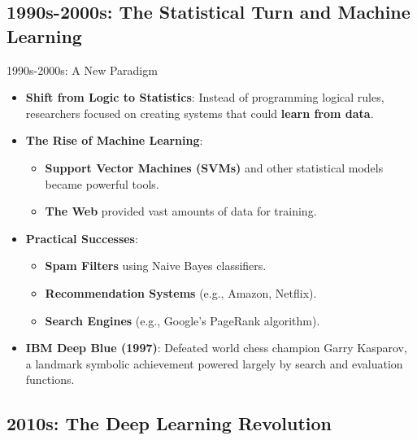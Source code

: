 \documentclass{beamer}
\begin{document}
\subsection{1990s-2000s: The Statistical Turn and Machine Learning}

\begin{frame}[t]{1990s-2000s: A New Paradigm}
\begin{itemize}
    \item \textbf{Shift from Logic to Statistics}: Instead of programming logical rules, researchers focused on creating systems that could \textbf{learn from data}.
    \item \textbf{The Rise of Machine Learning}:
        \begin{itemize}
            \item \textbf{Support Vector Machines (SVMs)} and other statistical models became powerful tools.
            \item \textbf{The Web} provided vast amounts of data for training.
        \end{itemize}
    \item \textbf{Practical Successes}:
        \begin{itemize}
            \item \textbf{Spam Filters} using Naive Bayes classifiers.
            \item \textbf{Recommendation Systems} (e.g., Amazon, Netflix).
            \item \textbf{Search Engines} (e.g., Google's PageRank algorithm).
        \end{itemize}
    \item \textbf{IBM Deep Blue (1997)}: Defeated world chess champion Garry Kasparov, a landmark symbolic achievement powered largely by search and evaluation functions.
\end{itemize}
\begin{center}
    \quad
\end{center}
\end{frame}

\subsection{2010s: The Deep Learning Revolution}
\end{document}
